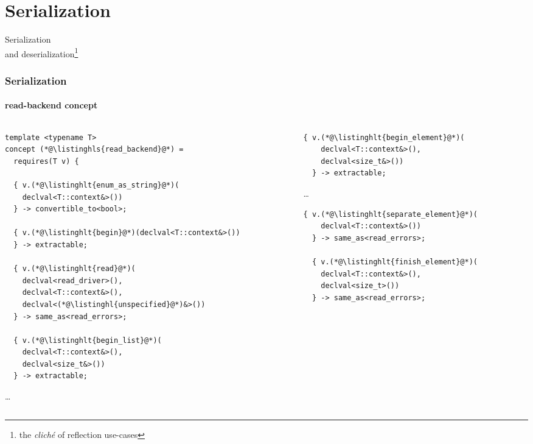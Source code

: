\documentclass[compress,table,xcolor=table]{beamer}
\begin{document}
\section{Serialization}
\begin{frame}[c]
  \Huge
  \centering
  Serialization\\
  \Large
  and deserialization\footnote{the {\em cliché} of reflection use-cases}
\end{frame}
\begin{frame}[fragile]
  \frametitle{Serialization}
  \framesubtitle{read-backend concept}
  \smaller
  \begin{columns}
    \begin{column}{.65\textwidth}
      \begin{lstlisting}[language=c++2x,basicstyle=\scriptsize\ttfamily]
template <typename T>
concept (*@\listinghls{read_backend}@*) =
  requires(T v) {

  { v.(*@\listinghlt{enum_as_string}@*)(
    declval<T::context&>())
  } -> convertible_to<bool>;

  { v.(*@\listinghlt{begin}@*)(declval<T::context&>())
  } -> extractable;

  { v.(*@\listinghlt{read}@*)(
    declval<read_driver>(),
    declval<T::context&>(),
    declval<(*@\listinghl{unspecified}@*)&>())
  } -> same_as<read_errors>;

  { v.(*@\listinghlt{begin_list}@*)(
    declval<T::context&>(),
    declval<size_t&>())
  } -> extractable;
      \end{lstlisting}
      \ldots
    \end{column}
    \begin{column}{.35\textwidth}
      \begin{lstlisting}[language=c++2x,basicstyle=\tiny\ttfamily]
  { v.(*@\listinghlt{begin_element}@*)(
    declval<T::context&>(),
    declval<size_t&>())
  } -> extractable;
      \end{lstlisting}
      \ldots
      \begin{lstlisting}[language=c++2x,basicstyle=\miniscule\ttfamily]
  { v.(*@\listinghlt{separate_element}@*)(
    declval<T::context&>())
  } -> same_as<read_errors>;

  { v.(*@\listinghlt{finish_element}@*)(
    declval<T::context&>(),
    declval<size_t>())
  } -> same_as<read_errors>;


\end{lstlisting}
\end{column}
\end{columns}
\end{frame}
\end{document}
